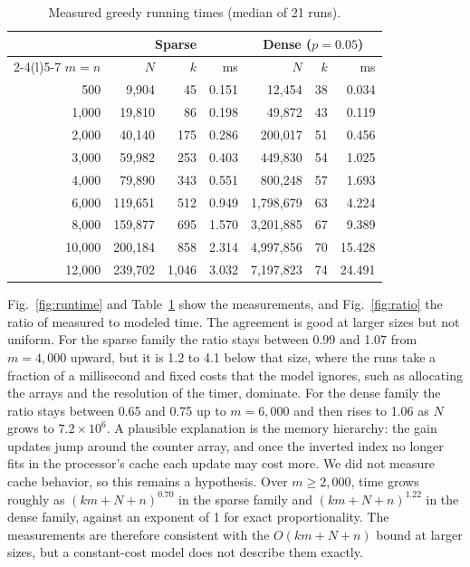 \documentclass[conference]{IEEEtran}
\theoremstyle{definition}
\theoremstyle{remark}
\begin{document}
\begin{table}[t]
\centering
\caption{Measured greedy running times (median of 21 runs).}
\label{tab:runtime}
\small
\setlength{\tabcolsep}{4pt}
\begin{tabular}{@{}r rrr rrr@{}}
\toprule
 & \multicolumn{3}{c}{Sparse} & \multicolumn{3}{c}{Dense ($p=0.05$)} \\
\cmidrule(lr){2-4}\cmidrule(l){5-7}
$m = n$ & $N$ & $k$ & ms & $N$ & $k$ & ms \\
\midrule
500    &   9{,}904 &    45 & 0.151 &    12{,}454 & 38 &  0.034 \\
1{,}000  &  19{,}810 &    86 & 0.198 &    49{,}872 & 43 &  0.119 \\
2{,}000  &  40{,}140 &   175 & 0.286 &   200{,}017 & 51 &  0.456 \\
3{,}000  &  59{,}982 &   253 & 0.403 &   449{,}830 & 54 &  1.025 \\
4{,}000  &  79{,}890 &   343 & 0.551 &   800{,}248 & 57 &  1.693 \\
6{,}000  & 119{,}651 &   512 & 0.949 & 1{,}798{,}679 & 63 &  4.224 \\
8{,}000  & 159{,}877 &   695 & 1.570 & 3{,}201{,}885 & 67 &  9.389 \\
10{,}000 & 200{,}184 &   858 & 2.314 & 4{,}997{,}856 & 70 & 15.428 \\
12{,}000 & 239{,}702 & 1{,}046 & 3.032 & 7{,}197{,}823 & 74 & 24.491 \\
\bottomrule
\end{tabular}
\end{table}

Fig.~\ref{fig:runtime} and Table~\ref{tab:runtime} show the measurements, and
Fig.~\ref{fig:ratio} the ratio of measured to modeled time. The agreement is
good at larger sizes but not uniform. For the sparse family the ratio stays
between 0.99 and 1.07 from $m = 4{,}000$ upward, but it is 1.2 to 4.1 below
that size, where the runs take a fraction of a millisecond and fixed costs
that the model ignores, such as allocating the arrays and the resolution of
the timer, dominate. For the dense family the ratio stays between 0.65 and
0.75 up to $m = 6{,}000$ and then rises to 1.06 as $N$ grows to
$7.2\times 10^6$. A plausible explanation is the memory hierarchy: the gain
updates jump around the counter array, and once the inverted index no longer
fits in the processor's cache each update may cost more. We did not measure
cache behavior, so this remains a hypothesis. Over $m \ge 2{,}000$, time grows
roughly as $(km+N+n)^{0.70}$ in the sparse family and $(km+N+n)^{1.22}$ in the
dense family, against an exponent of 1 for exact proportionality. The
measurements are therefore consistent with the $O(km + N + n)$ bound at larger
sizes, but a constant-cost model does not describe them exactly.
\end{document}
